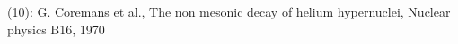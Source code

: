\documentclass[preview]{standalone}
\begin{document}
\begin{center}
(10): G. Coremans et al., The non mesonic decay of helium hypernuclei, Nuclear physics B16, 1970
\end{center}
\end{document}
